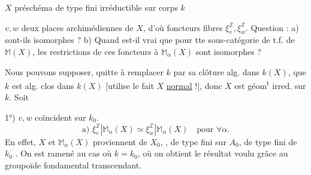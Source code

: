 $X$  préschéma de type fini  irréductible sur corps $k$

$v,w$ deux places archimédiennes de  $X$, d'où
foncteurs fibres $\xi_v^{\mathbb Z},\xi_w^{\mathbb Z}$. Question : a)  sont-ils
isomorphes ? b)  Quand est-il
vrai que pour tte sous-catégorie  de t.f. de
$\mathbb M(X)$, les restrictions de ces foncteurs à
$\mathbb M_\alpha(X)$ sont isomorphes ?

Nous pouvons supposer, quitte à remplacer $k$ par
sa clôture alg. dans $k(X)$, que $k$ est alg.
clos dans $k(X)$ [utilise le fait $X$ \uline{normal} !],
donc $X$ est géom\textsuperscript{t} irred. sur $k$. Soit 

1°) $v,w$ coïncident sur $k_0$.
\[
\text{a) }\xi_v^{\mathbb Z}|\mathbb M_\alpha(X)\simeq\xi_w^{\mathbb Z}|\mathbb M_\alpha(X)
\quad\text{pour }\forall\alpha.
\]
En effet, $X$ et $\mathbb M_\alpha(X)$ proviennent de
$X_0$, , de type fini sur $A_0$,  de
type fini de $k_0$ . On est ramené
au cas où $k=k_0$, où on obtient le
résultat voulu grâce au groupoïde fondamental
transcendant. 



